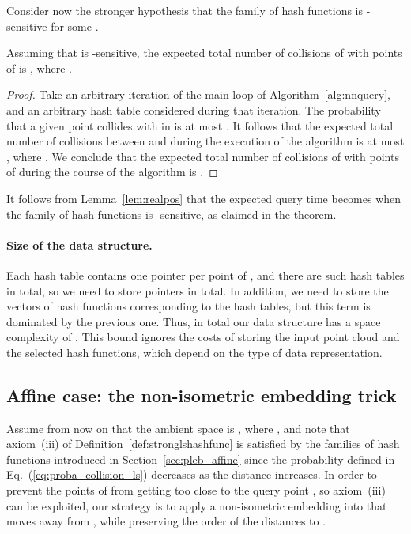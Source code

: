 Consider now the stronger hypothesis that the family  of hash
functions is -sensitive for some
.
\begin{lem} \label{lem:realpos}
Assuming that  is -sensitive,
the expected total number of collisions of  with points of
 is , where .
\end{lem}
\begin{proof}
 Take an arbitrary iteration  of the main loop of
 Algorithm~\ref{alg:nnquery}, and an arbitrary hash table 
 considered during that iteration. The probability that a given point
  collides with 
 in  is at most .  It follows that the expected total
 number of collisions between  and  during the execution of the
 algorithm is at most , where . We conclude that the
 expected total number of collisions of  with points of
  during the course of
 the algorithm is .
\end{proof}

It follows from Lemma~\ref{lem:realpos} that the expected query time
becomes  when the
family  of hash functions is -sensitive, as claimed in the theorem.

\paragraph{Size of the data structure.}
Each hash table contains one pointer per point of , and there are
 such hash
tables in total, so we need to store  pointers in total. In addition, we need
to store the 
vectors of hash functions corresponding to the hash tables, but this
term is dominated by the previous one. Thus, in total our data
structure has a space complexity of . This bound ignores the costs of storing
the input point cloud and the selected hash functions, which depend on
the type of data representation.



\subsection{Affine case: the non-isometric embedding trick}
\label{sec:erpleb_Rd}

Assume from now on that the ambient space is , where
, and note that axiom~(iii) of
Definition~\ref{def:stronglshashfunc} is satisfied by the families of
hash functions introduced in Section~\ref{sec:pleb_affine} since the
probability  defined in Eq.~(\ref{eq:proba_collision_ls})
decreases as the distance  increases. In order to prevent the
points of  from getting too close to the query point , so
axiom~(iii) can be exploited, our strategy is to 
apply a non-isometric embedding into  that moves
 away from , while preserving the order of the distances to .

